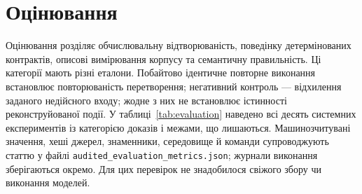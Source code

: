 \section{Оцінювання}
\label{sec:evaluation}

Оцінювання розділяє обчислювальну відтворюваність, поведінку детермінованих контрактів, описові вимірювання корпусу та семантичну правильність. Ці категорії мають різні еталони. Побайтово ідентичне повторне виконання встановлює повторюваність перетворення; негативний контроль --- відхилення заданого недійсного входу; жодне з них не встановлює істинності реконструйованої події. У таблиці~\ref{tab:evaluation} наведено всі десять системних експериментів із категорією доказів і межами, що лишаються. Машинозчитувані значення, хеші джерел, знаменники, середовище й команди супроводжують статтю у файлі \texttt{audited\_evaluation\_metrics.json}; журнали виконання зберігаються окремо. Для цих перевірок не знадобилося свіжого збору чи виконання моделей.

